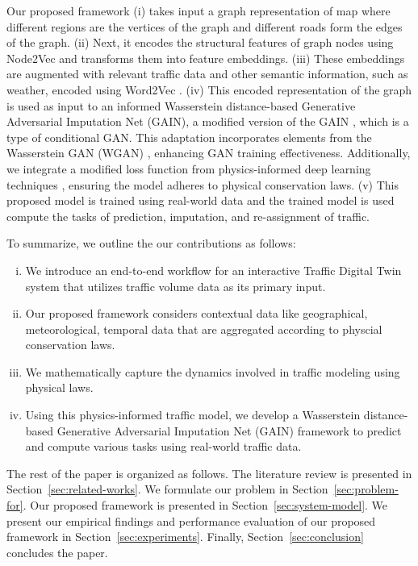 Our proposed framework (i) takes input a graph representation of map where different regions are the vertices of the graph and different roads form the edges of the graph. (ii) Next, it encodes the structural features of graph nodes using Node2Vec \cite{node2vec} and  transforms them into feature embeddings. (iii) These embeddings are augmented with relevant traffic data and other semantic information, such as weather, encoded using Word2Vec \cite{word2vec}.
(iv) This encoded representation of the graph is used as input to an informed Wasserstein distance-based Generative Adversarial Imputation Net (GAIN), a modified version of the GAIN \cite{gain}, which is a type of conditional GAN. This adaptation incorporates elements from the Wasserstein GAN (WGAN) \cite{wgan}, enhancing GAN training effectiveness. Additionally, we integrate a modified loss function from physics-informed deep learning techniques \cite{pidl}, ensuring the model adheres to physical conservation laws.
(v) This proposed model is trained using real-world data and the trained model is used compute the tasks of prediction, imputation, and re-assignment of traffic.

To summarize, we outline the our contributions as follows:

\begin{enumerate}[(i)]
\item We introduce an end-to-end workflow for an interactive Traffic Digital Twin system that utilizes traffic volume data as its primary input.
\item Our proposed framework considers contextual data like geographical, meteorological, temporal data that are aggregated according to physcial conservation laws.
\item We mathematically capture the dynamics involved in traffic modeling using physical laws.
\item Using this physics-informed traffic model, we develop a Wasserstein distance-based Generative Adversarial Imputation Net (GAIN) framework to predict and compute various tasks using real-world traffic data.
\end{enumerate}

The rest of the paper is organized as follows. The literature review is presented in Section~\ref{sec:related-works}. We formulate our problem in Section~\ref{sec:problem-for}. Our proposed framework is presented in Section~\ref{sec:system-model}. We present our empirical findings and performance evaluation of our proposed framework in Section~\ref{sec:experiments}. Finally, Section~\ref{sec:conclusion} concludes the paper.

